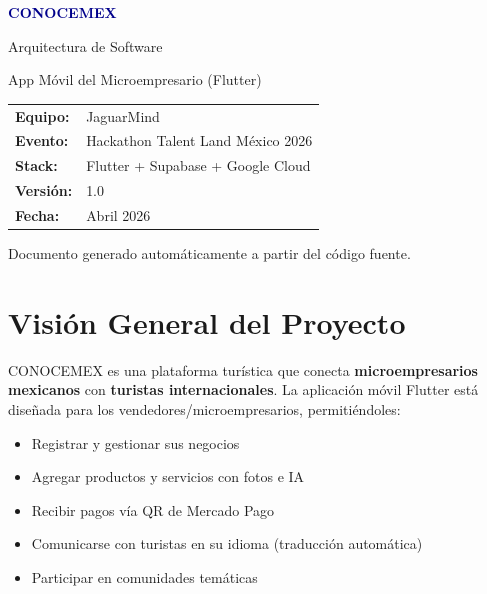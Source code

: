 \documentclass[12pt,a4paper]{article}
\begin{document}
\begin{titlepage}
\centering
\vspace*{3cm}

{\Huge\bfseries\textcolor{darkblue}{CONOCEMEX}\par}
\vspace{0.5cm}
{\Large\textcolor{primarygreen}{Arquitectura de Software}\par}
\vspace{1cm}
{\large App M\'ovil del Microempresario (Flutter)\par}

\vspace{2cm}

\begin{tabular}{ll}
\textbf{Equipo:} & JaguarMind \\
\textbf{Evento:} & Hackathon Talent Land M\'exico 2026 \\
\textbf{Stack:} & Flutter + Supabase + Google Cloud \\
\textbf{Versi\'on:} & 1.0 \\
\textbf{Fecha:} & Abril 2026 \\
\end{tabular}

\vfill

{\small Documento generado autom\'aticamente a partir del c\'odigo fuente.}
\end{titlepage}

\tableofcontents
\newpage

\section{Visi\'on General del Proyecto}

CONOCEMEX es una plataforma tur\'istica que conecta \textbf{microempresarios mexicanos} con \textbf{turistas internacionales}. La aplicaci\'on m\'ovil Flutter est\'a dise\~nada para los vendedores/microempresarios, permiti\'endoles:

\begin{itemize}[leftmargin=2cm]
    \item Registrar y gestionar sus negocios
    \item Agregar productos y servicios con fotos e IA
    \item Recibir pagos v\'ia QR de Mercado Pago
    \item Comunicarse con turistas en su idioma (traducci\'on autom\'atica)
    \item Participar en comunidades tem\'aticas
\end{itemize}
\end{document}
